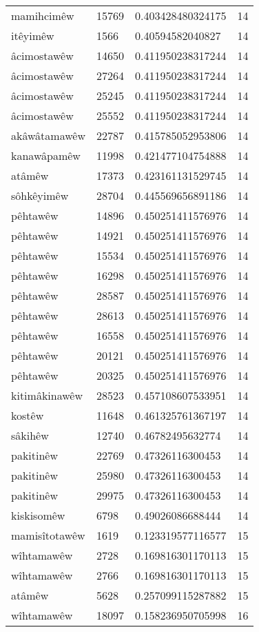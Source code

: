 \begin{longtable}{llll}
mamihcimêw & 15769 & 0.403428480324175 & 14\\
itêyimêw & 1566 & 0.40594582040827 & 14\\
âcimostawêw & 14650 & 0.411950238317244 & 14\\
âcimostawêw & 27264 & 0.411950238317244 & 14\\
âcimostawêw & 25245 & 0.411950238317244 & 14\\
âcimostawêw & 25552 & 0.411950238317244 & 14\\
akâwâtamawêw & 22787 & 0.415785052953806 & 14\\
kanawâpamêw & 11998 & 0.421477104754888 & 14\\
atâmêw & 17373 & 0.423161131529745 & 14\\
sôhkêyimêw & 28704 & 0.445569656891186 & 14\\
pêhtawêw & 14896 & 0.450251411576976 & 14\\
pêhtawêw & 14921 & 0.450251411576976 & 14\\
pêhtawêw & 15534 & 0.450251411576976 & 14\\
pêhtawêw & 16298 & 0.450251411576976 & 14\\
pêhtawêw & 28587 & 0.450251411576976 & 14\\
pêhtawêw & 28613 & 0.450251411576976 & 14\\
pêhtawêw & 16558 & 0.450251411576976 & 14\\
pêhtawêw & 20121 & 0.450251411576976 & 14\\
pêhtawêw & 20325 & 0.450251411576976 & 14\\
kitimâkinawêw & 28523 & 0.457108607533951 & 14\\
kostêw & 11648 & 0.461325761367197 & 14\\
sâkihêw & 12740 & 0.46782495632774 & 14\\
pakitinêw & 22769 & 0.47326116300453 & 14\\
pakitinêw & 25980 & 0.47326116300453 & 14\\
pakitinêw & 29975 & 0.47326116300453 & 14\\
kiskisomêw & 6798 & 0.49026086688444 & 14\\
mamisîtotawêw & 1619 & 0.123319577116577 & 15\\
wîhtamawêw & 2728 & 0.169816301170113 & 15\\
wîhtamawêw & 2766 & 0.169816301170113 & 15\\
atâmêw & 5628 & 0.257099115287882 & 15\\
wîhtamawêw & 18097 & 0.158236950705998 & 16\\

\end{longtable}
